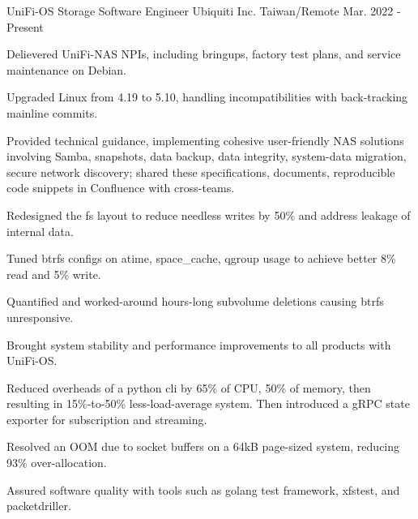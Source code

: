 

\begin{cventries}

  \cventry
    {UniFi-OS Storage Software Engineer} %
    {Ubiquiti Inc.} %
    {Taiwan/Remote} %
    {Mar. 2022 - Present} %
    {
      \begin{cvitems} %
        \item {Delievered UniFi-NAS NPIs, including bringups, factory test
          plans, and service maintenance on Debian.}
        \item Upgraded Linux from 4.19 to 5.10, handling incompatibilities with back-tracking mainline commits.
        \item Provided technical guidance, implementing cohesive user-friendly NAS solutions involving Samba, snapshots, data backup, data integrity, system-data migration, secure network discovery; shared these specifications, documents, reproducible code snippets in Confluence with cross-teams.
        \item Redesigned the fs layout to reduce needless writes by 50\% and address leakage of internal data.
        \item Tuned btrfs configs on atime, space\_cache, qgroup usage to achieve
        better 8\% read and 5\% write.
        \item Quantified and worked-around hours-long subvolume deletions causing btrfs unresponsive.
        \item Brought system stability and performance improvements to all products with UniFi-OS.
        \item Reduced overheads of a python cli by 65\% of CPU, 50\% of memory, then
        resulting in 15\%-to-50\% less-load-average system. Then introduced a gRPC state exporter for subscription and streaming.
        \item Resolved an OOM due to socket buffers on a 64kB page-sized system,
        reducing 93\% over-allocation.
        \item Assured software quality with tools such as golang test framework, xfstest, and packetdriller.
      \end{cvitems}
    }


\end{cventries}
